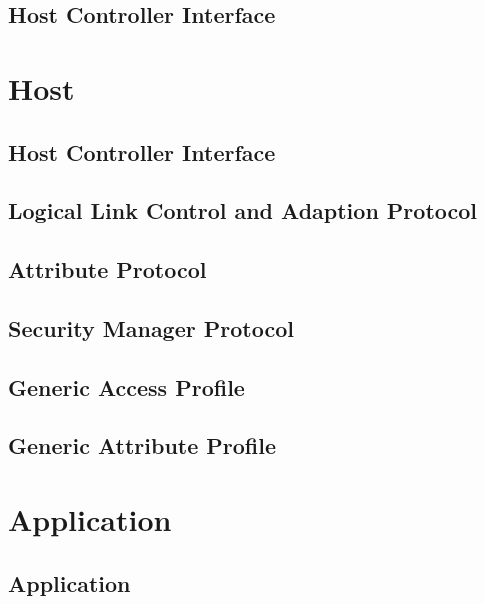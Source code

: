 \documentclass[pdftex,a4paper,12pt,twoside]{report}
\begin{document}
\subsection{Host Controller Interface}
\label{subsec:controllerHCI}

\section{Host}
\label{sec:stackHost}

\subsection{Host Controller Interface}
\label{subsec:hostHCI}

\subsection{Logical Link Control and Adaption Protocol}
\label{subsec:hostATTL2CAP}

\subsection{Attribute Protocol}
\label{subsec:hostATT}

\subsection{Security Manager Protocol}
\label{subsec:hostSMP}

\subsection{Generic Access Profile}
\label{subsec:hostGAP}

\subsection{Generic Attribute Profile}
\label{subsec:hostGATT}

\section{Application}
\label{sec:stackApplication}

\subsection{Application}
\label{subsec:applicationApp}
\end{document}

